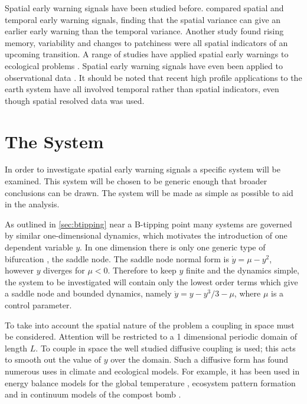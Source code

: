 Spatial early warning signals have been studied before. \parencite{Donangelo2010} compared spatial and temporal early warning signals, finding that the spatial variance
can give an earlier early warning than the temporal variance. Another study \parencite{Kefi2014} found rising memory, variability and changes to patchiness were all
spatial indicators of an upcoming transition. A range of studies have applied spatial early warnings to ecological problems \parencite{Carpenter2010,Dakos2011,Guttal2009}.
Spatial early warning signals have even been applied to observational data \parencite{Tirabassi2023,Kefi2007,Eby2017}. It should be noted that recent high profile applications to
the earth system \parencite{Boulton2022,Boers2021,Boers2021a} have all involved temporal rather than spatial indicators, even though spatial resolved data was used.

\section{The System}
In order to investigate spatial early warning signals a specific system will be examined. This system will be chosen
to be generic enough that broader conclusions can be drawn. The system will be made as simple as possible to aid in the analysis.

As outlined in \cref{sec:btipping} near a B-tipping point many systems are governed by similar one-dimensional dynamics, which motivates the introduction of one dependent
variable $y$. In one dimension there is only one generic type of bifurcation \parencite{Thompson1994}, the saddle node. The saddle node normal form is
$\dot{y} = \mu - y^2$, however $y$ diverges for $\mu < 0$. Therefore to keep $y$ finite and the dynamics simple, the system to be investigated will contain only the lowest order terms
which give a saddle node and bounded dynamics, namely $\dot{y} = y - y^3/3 - \mu$, where $\mu$ is a control parameter.

To take into account the spatial nature of the problem a coupling in space must be considered. Attention will be restricted to a 1 dimensional
periodic domain of length $L$. To couple in space the well studied diffusive coupling is used; this acts to smooth out the value of $y$ over the domain.
Such a diffusive form has found numerous uses in climate and ecological models. For example, it has been used in energy balance models for
the global temperature \parencite{Ghil1976}, ecosystem pattern formation \parencite{Gowda2014,Bastiaansen2018} and in continuum models of the compost bomb \parencite{Clarke2021}.

